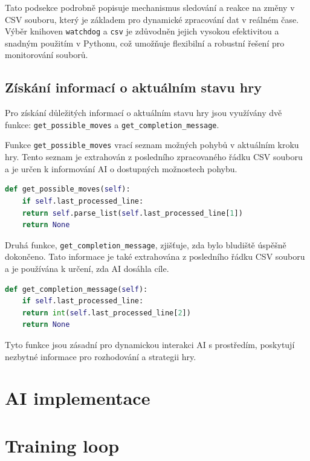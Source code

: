 \documentclass[12pt, a4paper,
twoside,        %
openright
]{report}
\begin{document}
Tato podsekce podrobně popisuje mechanismus sledování a reakce na změny v CSV souboru, který je základem pro dynamické zpracování dat v reálném čase. Výběr knihoven \texttt{watchdog} a \texttt{csv} je zdůvodněn jejich vysokou efektivitou a snadným použitím v Pythonu, což umožňuje flexibilní a robustní řešení pro monitorování souborů.

\subsection{Získání informací o aktuálním stavu hry}
Pro získání důležitých informací o aktuálním stavu hry jsou využívány dvě funkce: \texttt{get\_possible\_moves} a \texttt{get\_completion\_message}.

Funkce \texttt{get\_possible\_moves} vrací seznam možných pohybů v aktuálním kroku hry. Tento seznam je extrahován z posledního zpracovaného řádku CSV souboru a je určen k informování AI o dostupných možnostech pohybu.

\begin{lstlisting}[language=Python, caption={Získání seznamu možných pohybů}]
	def get_possible_moves(self):
	if self.last_processed_line:
	return self.parse_list(self.last_processed_line[1])
	return None
\end{lstlisting}
\newpage
Druhá funkce, \texttt{get\_completion\_message}, zjišťuje, zda bylo bludiště úspěšně dokončeno. Tato informace je také extrahována z posledního řádku CSV souboru a je používána k určení, zda AI dosáhla cíle.

\begin{lstlisting}[language=Python, caption={Zjištění dokončení bludiště}]
	def get_completion_message(self):
	if self.last_processed_line:
	return int(self.last_processed_line[2])
	return None
\end{lstlisting}

Tyto funkce jsou zásadní pro dynamickou interakci AI s prostředím, poskytují nezbytné informace pro rozhodování a strategii hry.



\section{AI implementace}


\section{Training loop}
\end{document}
